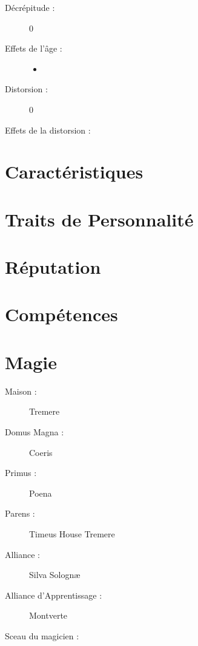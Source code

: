 \begin{multicols}{2}
\begin{description}
\item[Décrépitude :] 0
\item[Effets de l'âge :]\hspace{0pt}
\begin{itemize}
\item
\end{itemize}
\columnbreak
\item[Distorsion :] 0
\item[Effets de la distorsion :]\hspace{0pt}
\magusscarslong
\end{description}
\end{multicols}
\section*{Caractéristiques}


\caractableMP

\begin{multicols*}{2}

\longVFQs

\section*{Traits de Personnalité}

\traitslong

\section*{Réputation}

\reputationslong



\section*{Compétences}

\abilitieslong

\end{multicols*}

\pagebreak

\section*{Magie}
\begin{multicols}{2}
\begin{description}
\item[Maison :] Tremere
\item[Domus Magna :] Coeris
\item[Primus :] Poena
\item[Parens :] Timeus House Tremere
\item[Alliance :] Silva Solognæ
\item[Alliance d'Apprentissage :] Montverte
\item[Sceau du magicien :] \magussigil
\end{description}
\end{multicols}
